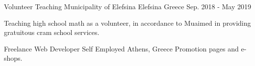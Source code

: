 \begin{cventries}


  \cventry
    {Volunteer Teaching} %
    {Municipality of Elefsina} %
    {Elefsina Greece} %
    {Sep. 2018 - May 2019} %
    {
      \begin{cvitems} %
        \item {Teaching high school math as a volunteer, in accordance to Muaimed in providing gratuitous cram school services.}
      \end{cvitems}
    }

\cventry
{Freelance Web Developer} %
{Self Employed} %
{Athens, Greece} %
{} %
{
	Promotion pages and e-shops.
}

\end{cventries}
